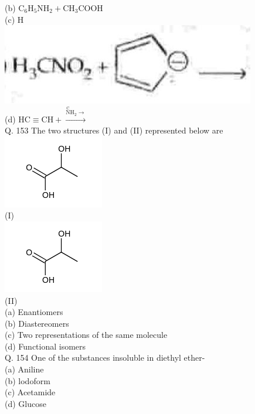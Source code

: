 \documentclass[10pt]{article}
\begin{document}
(b) $\mathrm{C}_{6} \mathrm{H}_{5} \mathrm{NH}_{2}+\mathrm{CH}_{3} \mathrm{COOH}$ $\qquad$\\
(c) H\\
\includegraphics[max width=\textwidth, center]{2025_01_28_8470952b98110cec3aabg-144(1)}\\
(d) $\mathrm{HC} \equiv \mathrm{CH}+\stackrel{\stackrel{\mathrm{C}}{\mathrm{N}} \mathrm{H}_{2} \longrightarrow}{\longrightarrow}$\\
Q. 153 The two structures (I) and (II) represented below are\\
\includegraphics{smile-e65f1063d146c9560c37388155730687aabc991a}\\
(I)\\
\includegraphics{smile-6d603b193ae212340f8083b3bc4b234aaaeae27b}\\
(II)\\
(a) Enantiomers\\
(b) Diastereomers\\
(c) Two representations of the same molecule\\
(d) Functional isomers\\
Q. 154 One of the substances insoluble in diethyl ether-\\
(a) Aniline\\
(b) lodoform\\
(c) Acetamide\\
(d) Glucose\\
\end{document}
